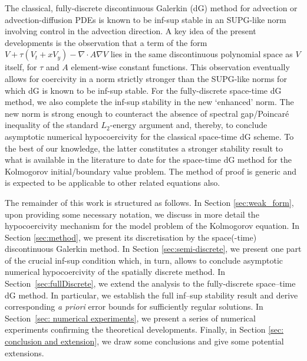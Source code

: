 \documentclass{amsart}
\theoremstyle{definition}
\theoremstyle{remark}
\numberwithin{equation}{section}
\begin{document}
 The classical, fully-discrete discontinuous Galerkin (dG) method for advection or advection-diffusion PDEs is known to be inf-sup stable in an  SUPG-like norm \cite{johnson_pitkaranta, ErnGuermoond06, ayuso_marini, MR2257111, cdgh_book, MR3672375} involving control in the advection direction. A key idea of the present developments is the observation that a term of the form $V+\tau (V_t+xV_y)-\nabla\cdot A\nabla V$ lies in the same discontinuous polynomial space as $V$ itself, for $\tau$ and $A$ element-wise constant functions. This observation eventually allows for coercivity in a norm strictly stronger than the SUPG-like norms for which dG is known to be inf-sup stable. For the fully-discrete space-time dG method, we also complete the inf-sup stability in the new `enhanced' norm.  The new norm is strong enough to counteract the absence of  spectral gap/Poincar\'e inequality of the standard $L_2$-energy argument and, thereby, to conclude asymptotic numerical hypocoercivity for the classical space-time dG scheme. To the best of our knowledge, the latter constitutes a stronger stability result to what is available in the literature to date for the space-time dG method for the Kolmogorov initial/boundary value problem. The method of proof is generic and is expected to be applicable to other related equations also.


The remainder of this work is structured as follows. In Section \ref{sec:weak_form}, upon providing some necessary notation, we discuss in more detail the hypocoercivity mechanism for the model problem of the Kolmogorov equation. In Section \ref{sec:method}, we present its discretisation by the space(-time) discontinuous Galerkin method. In Section \ref{sec:semi-discrete}, we present one part of the crucial inf-sup condition which, in turn, allows to conclude asymptotic numerical hypocoercivity of the spatially discrete method. In Section~\ref{sec:fullDiscrete}, we extend the analysis to the fully-discrete space--time dG method. In particular, we establish the full inf--sup stability result and derive corresponding \emph{a priori} error bounds for sufficiently regular solutions. In Section~\ref{sec: numerical experiments}, we present a series of numerical experiments confirming the theoretical developments.
Finally, in Section \ref{sec: conclusion and extension}, we draw some conclusions and give some potential extensions.
\end{document}
